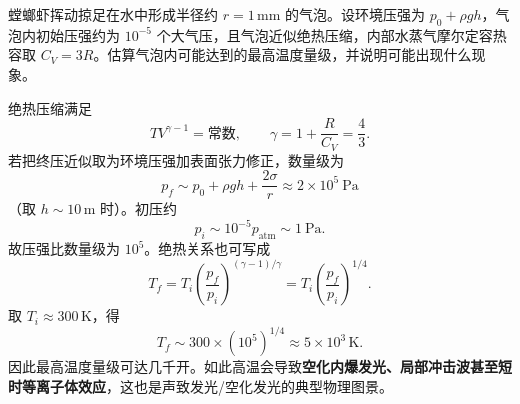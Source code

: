 \begin{question}
螳螂虾挥动掠足在水中形成半径约 $r=1\,\mathrm{mm}$ 的气泡。设环境压强为 $p_0+\rho gh$，气泡内初始压强约为 $10^{-5}$ 个大气压，且气泡近似绝热压缩，内部水蒸气摩尔定容热容取 $C_V=3R$。估算气泡内可能达到的最高温度量级，并说明可能出现什么现象。
\begin{solution}

绝热压缩满足
\[
TV^{\gamma-1}=\text{常数},
\qquad \gamma=1+\frac{R}{C_V}=\frac43.
\]
若把终压近似取为环境压强加表面张力修正，数量级为
\[
p_f\sim p_0+\rho gh+\frac{2\sigma}{r}\approx 2\times10^5\ \mathrm{Pa}
\]
（取 $h\sim10\,\mathrm m$ 时）。初压约
\[
p_i\sim10^{-5}p_\text{atm}\sim1\ \mathrm{Pa}.
\]
故压强比数量级为 $10^5$。绝热关系也可写成
\[
T_f=T_i\left(\frac{p_f}{p_i}\right)^{(\gamma-1)/\gamma}=T_i\left(\frac{p_f}{p_i}\right)^{1/4}.
\]
取 $T_i\approx300\,\mathrm K$，得
\[
T_f\sim 300\times (10^5)^{1/4}\approx 5\times10^3\,\mathrm K.
\]
因此最高温度量级可达几千开。如此高温会导致\textbf{空化内爆发光、局部冲击波甚至短时等离子体效应}，这也是声致发光/空化发光的典型物理图景。

\end{solution}
\end{question}

